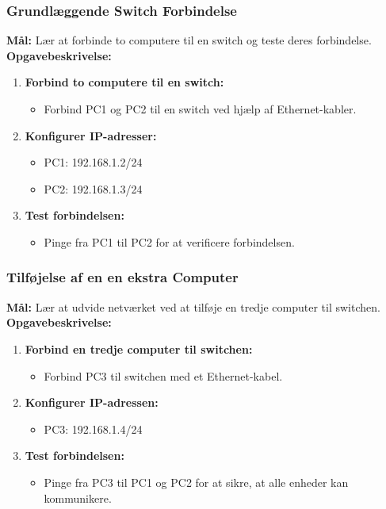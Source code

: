 \subsubsection{Grundlæggende Switch Forbindelse}
\textbf{Mål:} Lær at forbinde to computere til en switch og teste deres forbindelse.
\newline\newline\noindent
\textbf{Opgavebeskrivelse:}
\begin{enumerate}
	\item \textbf{Forbind to computere til en switch:}
	\begin{itemize}
		\item Forbind PC1 og PC2 til en switch ved hjælp af Ethernet-kabler.
	\end{itemize}
	\item \textbf{Konfigurer IP-adresser:}
	\begin{itemize}
		\item PC1: 192.168.1.2/24
		\item PC2: 192.168.1.3/24
	\end{itemize}
	\item \textbf{Test forbindelsen:}
	\begin{itemize}
		\item Pinge fra PC1 til PC2 for at verificere forbindelsen.
	\end{itemize}
\end{enumerate}

\subsubsection{Tilføjelse af en en ekstra Computer}
\textbf{Mål:} Lær at udvide netværket ved at tilføje en tredje computer til switchen.
\newline\newline\noindent
\textbf{Opgavebeskrivelse:}
\begin{enumerate}
	\item \textbf{Forbind en tredje computer til switchen:}
	\begin{itemize}
		\item Forbind PC3 til switchen med et Ethernet-kabel.
	\end{itemize}
	\item \textbf{Konfigurer IP-adressen:}
	\begin{itemize}
		\item PC3: 192.168.1.4/24
	\end{itemize}
	\item \textbf{Test forbindelsen:}
	\begin{itemize}
		\item Pinge fra PC3 til PC1 og PC2 for at sikre, at alle enheder kan kommunikere.
	\end{itemize}
\end{enumerate}

